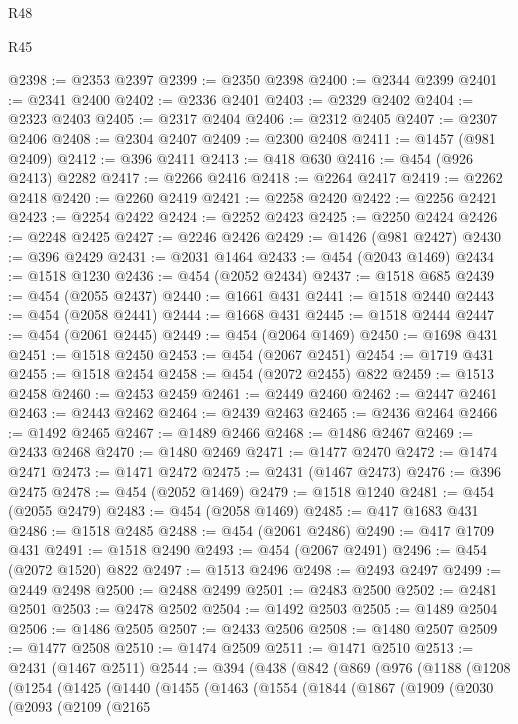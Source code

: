 \begin{lexlean}{R48}
\begin{lexlean}{R45}
\begin{coremodule}
{{{{{{{{{{{{{{{{{{{{{{{{{{{{{{{{{{{{{{{{{{{{{{{{{{{{{{{{{{{{{{{{{{{{{{{{{{{{{{{{{{{{{{{{{{{@2398 := @2353 @2397
@2399 := @2350 @2398
@2400 := @2344 @2399
@2401 := @2341 @2400
@2402 := @2336 @2401
@2403 := @2329 @2402
@2404 := @2323 @2403
@2405 := @2317 @2404
@2406 := @2312 @2405
@2407 := @2307 @2406
@2408 := @2304 @2407
@2409 := @2300 @2408
@2411 := @1457 (@981 @2409)
@2412 := @396 @2411
@2413 := @418 @630
@2416 := @454 (@926 @2413) @2282
@2417 := @2266 @2416
@2418 := @2264 @2417
@2419 := @2262 @2418
@2420 := @2260 @2419
@2421 := @2258 @2420
@2422 := @2256 @2421
@2423 := @2254 @2422
@2424 := @2252 @2423
@2425 := @2250 @2424
@2426 := @2248 @2425
@2427 := @2246 @2426
@2429 := @1426 (@981 @2427)
@2430 := @396 @2429
@2431 := @2031 @1464
@2433 := @454 (@2043 @1469)
@2434 := @1518 @1230
@2436 := @454 (@2052 @2434)
@2437 := @1518 @685
@2439 := @454 (@2055 @2437)
@2440 := @1661 @431
@2441 := @1518 @2440
@2443 := @454 (@2058 @2441)
@2444 := @1668 @431
@2445 := @1518 @2444
@2447 := @454 (@2061 @2445)
@2449 := @454 (@2064 @1469)
@2450 := @1698 @431
@2451 := @1518 @2450
@2453 := @454 (@2067 @2451)
@2454 := @1719 @431
@2455 := @1518 @2454
@2458 := @454 (@2072 @2455) @822
@2459 := @1513 @2458
@2460 := @2453 @2459
@2461 := @2449 @2460
@2462 := @2447 @2461
@2463 := @2443 @2462
@2464 := @2439 @2463
@2465 := @2436 @2464
@2466 := @1492 @2465
@2467 := @1489 @2466
@2468 := @1486 @2467
@2469 := @2433 @2468
@2470 := @1480 @2469
@2471 := @1477 @2470
@2472 := @1474 @2471
@2473 := @1471 @2472
@2475 := @2431 (@1467 @2473)
@2476 := @396 @2475
@2478 := @454 (@2052 @1469)
@2479 := @1518 @1240
@2481 := @454 (@2055 @2479)
@2483 := @454 (@2058 @1469)
@2485 := @417 @1683 @431
@2486 := @1518 @2485
@2488 := @454 (@2061 @2486)
@2490 := @417 @1709 @431
@2491 := @1518 @2490
@2493 := @454 (@2067 @2491)
@2496 := @454 (@2072 @1520) @822
@2497 := @1513 @2496
@2498 := @2493 @2497
@2499 := @2449 @2498
@2500 := @2488 @2499
@2501 := @2483 @2500
@2502 := @2481 @2501
@2503 := @2478 @2502
@2504 := @1492 @2503
@2505 := @1489 @2504
@2506 := @1486 @2505
@2507 := @2433 @2506
@2508 := @1480 @2507
@2509 := @1477 @2508
@2510 := @1474 @2509
@2511 := @1471 @2510
@2513 := @2431 (@1467 @2511)
@2544 := @394
    (@438
      (@842
        (@869
          (@976
            (@1188
              (@1208
                (@1254
                  (@1425
                    (@1440
                      (@1455
                        (@1463
                          (@1554
                            (@1844
                              (@1867
                                (@1909
                                  (@2030
                                    (@2093
                                      (@2109
                                        (@2165
}}}}}}}}}}}}}}}}}}}}}}}}}}}}}}}}}}}}}}}}}}}}}}}}}}}}}}}}}}}}}}}}}}}}}}}}}}}}}}}}}}}}}}}}}}}
\end{coremodule}
\end{lexlean}
\end{lexlean}
